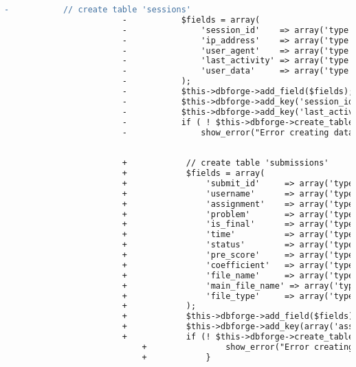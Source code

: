 \begin{lstlisting}[language=diff, caption=Perubahan pada kode Install.php]
						-			// create table 'sessions'
						-			$fields = array(
						-				'session_id'    => array('type' => 'VARCHAR', 'constraint' => 40, 'default' => '0'),
						-				'ip_address'    => array('type' => 'VARCHAR', 'constraint' => 45, 'default' => '0'),
						-				'user_agent'    => array('type' => 'VARCHAR', 'constraint' => 120),
						-				'last_activity' => array('type' => 'INT', 'constraint' => 10, 'unsigned' => TRUE, 'default' => '0'),
						-				'user_data'     => array('type' => 'TEXT'),
						-			);
						-			$this->dbforge->add_field($fields);
						-			$this->dbforge->add_key('session_id', TRUE); // PRIMARY KEY
						-			$this->dbforge->add_key('last_activity');
						-			if ( ! $this->dbforge->create_table('sessions', TRUE))
						-				show_error("Error creating database table ".$this->db->dbprefix('sessions'));
						
						
						+            // create table 'submissions'
						+            $fields = array(
						+                'submit_id'     => array('type' => 'INT', 'constraint' => 11, 'unsigned' => true),
						+                'username'      => array('type' => 'VARCHAR', 'constraint' => 20),
						+                'assignment'    => array('type' => 'SMALLINT', 'constraint' => 4, 'unsigned' => true),
						+                'problem'       => array('type' => 'SMALLINT', 'constraint' => 4, 'unsigned' => true),
						+                'is_final'      => array('type' => 'TINYINT', 'constraint' => 1, 'default' => 0),
						+                'time'          => array('type' => $DATETIME),
						+                'status'        => array('type' => 'VARCHAR', 'constraint' => 100),
						+                'pre_score'     => array('type' => 'INT', 'constraint' => 11),
						+                'coefficient'   => array('type' => 'VARCHAR', 'constraint' => 6),
						+                'file_name'     => array('type' => 'VARCHAR', 'constraint' => 100),
						+                'main_file_name' => array('type' => 'VARCHAR', 'constraint' => 100),
						+                'file_type'     => array('type' => 'VARCHAR', 'constraint' => 6),
						+            );
						+            $this->dbforge->add_field($fields);
						+            $this->dbforge->add_key(array('assignment', 'submit_id'));
						+            if (! $this->dbforge->create_table('submissions', true)) {
							+                show_error("Error creating database table ".$this->db->dbprefix('submissions'));
							+            }
						

\end{lstlisting}
